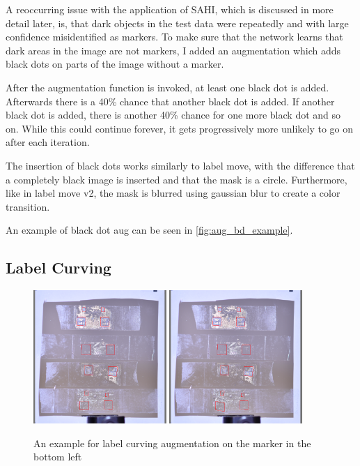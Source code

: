 \documentclass[10pt]{book}
\begin{document}
A reoccurring issue with the application of \ac{SAHI}, which is discussed in more detail later, is, that dark objects in the test data were repeatedly and with large confidence misidentified as markers. To make sure that the network learns that dark areas in the image are not markers, I added an augmentation which adds black dots on parts of the image without a marker. 

After the augmentation function is invoked, at least one black dot is added. Afterwards there is a 40\% chance that another black dot is added. If another black dot is added, there is another 40\% chance for one more black dot and so on. While this could continue forever, it gets progressively more unlikely to go on after each iteration. 

The insertion of black dots works similarly to label move, with the difference that a completely black image is inserted and that the mask is a circle. Furthermore, like in label move v2, the mask is blurred using gaussian blur to create a color transition.

An example of black dot aug can be seen in \autoref{fig:aug_bd_example}.

\subsection{Label Curving}

\begin{figure}
  \centering
     {\includegraphics[width=0.45\textwidth]{image/aug_lc_before}}
     {\includegraphics[width=0.45\textwidth]{image/aug_lc_after}}
  \caption{An example for label curving augmentation on the marker in the bottom left}
  \label{fig:aug_lc_example}
\end{figure}
\end{document}
